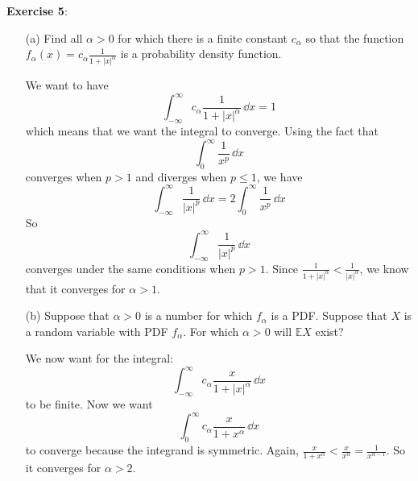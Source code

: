 \documentclass{article}
\begin{document}
\newpage

\textbf{Exercise 5}: 
    \begin{itemize}
        \item [(a)] Find all $\alpha > 0$ for which there is a finite constant $c_{\alpha}$ so that the function $f_{\alpha}(x) = c_{\alpha}\frac{1}{1 + \lvert x \rvert^{\alpha}}$ is a probability density function.
            \begin{answer}
                We want to have
                    \begin{equation*}
                        \int_{-\infty}^{\infty} c_{\alpha}\dfrac{1}{1 + \lvert x \rvert^{\alpha}} \, \dd{x} = 1
                    \end{equation*}
                which means that we want the integral to converge. Using the fact that
                    \begin{equation*}
                        \int_{0}^{\infty} \dfrac{1}{x^{p}} \, \dd{x} 
                    \end{equation*}
                converges when $p > 1$ and diverges when $p \leq 1$, we have
                    \begin{equation*}
                        \int_{-\infty}^{\infty} \dfrac{1}{\lvert x \rvert^{p}} \, \dd{x}  = 2\int_{0}^{\infty} \dfrac{1}{x^{p}} \, \dd{x} 
                    \end{equation*}
                So 
                    \begin{equation*}
                        \int_{-\infty}^{\infty} \dfrac{1}{\lvert x \rvert^{p}} \, \dd{x} 
                    \end{equation*}
                converges under the same conditions when $p > 1$. Since $\frac{1}{1 + \lvert x \rvert^{\alpha}} < \frac{1}{\lvert x \rvert^{\alpha}}$, we know that it converges for $\alpha > 1$.
            \end{answer}

        \item [(b)] Suppose that $\alpha > 0$ is a number for which $f_{\alpha}$ is a PDF. Suppose that $X$ is a random variable with PDF $f_{\alpha}$. For which $\alpha > 0$ will $\mathbb{E}X$ exist?
            \begin{answer}
                We now want for the integral:
                    \begin{equation*}
                        \int_{-\infty}^{\infty} c_{\alpha}\dfrac{x}{1 + \lvert x \rvert^{\alpha}} \, \dd{x} 
                    \end{equation*}
                to be finite. Now we want 
                    \begin{equation*}
                        \int_{0}^{\infty} c_{\alpha}\dfrac{x}{1 + x^{\alpha}} \, \dd{x} 
                    \end{equation*}
                to converge because the integrand is symmetric. Again, $\frac{x}{1 + x^{\alpha}} < \frac{x}{x^{\alpha}} = \frac{1}{x^{\alpha - 1}}$. So it converges for $\alpha > 2$.
            \end{answer}


\end{itemize}
\end{document}

